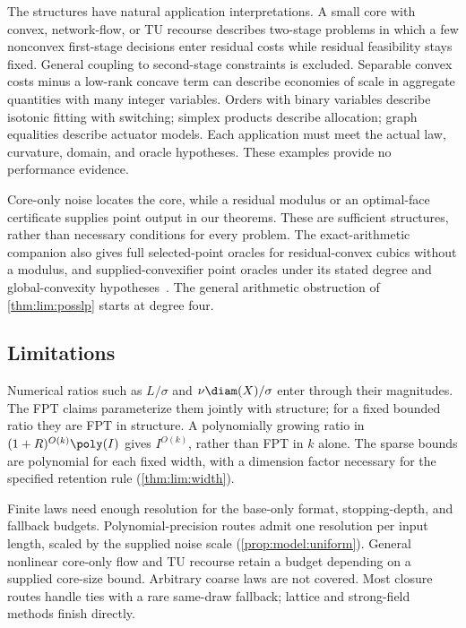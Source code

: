 The structures have natural application interpretations. A small core with
convex, network-flow, or TU recourse describes two-stage problems in which a
few nonconvex first-stage decisions enter residual costs while residual
feasibility stays fixed. General coupling to second-stage constraints is
excluded. Separable convex costs minus a low-rank concave term can describe
economies of scale in aggregate quantities with many integer variables.
Orders with binary variables describe isotonic fitting with switching;
simplex products describe allocation; graph equalities describe actuator
models. Each application must meet the actual law, curvature, domain, and
oracle hypotheses. These examples provide no performance evidence.

Core-only noise locates the core, while a residual modulus or an optimal-face
certificate supplies point output in our theorems. These are sufficient
structures, rather than necessary conditions for every problem. The
exact-arithmetic companion also gives full selected-point oracles for
residual-convex cubics without a modulus, and supplied-convexifier point
oracles under its stated degree and global-convexity
hypotheses~\citep{companion-exact-arithmetic}. The general arithmetic
obstruction of \cref{thm:lim:posslp} starts at degree four.

\subsection{Limitations}\label{sec:disc:limits}

Numerical ratios such as $L/\sigma$ and $\nu\diam(X)/\sigma$ enter through
their magnitudes. The FPT claims parameterize them jointly with structure;
for a fixed bounded ratio they are FPT in structure. A polynomially growing
ratio in $(1+R)^{O(k)}\poly(I)$ gives $I^{O(k)}$, rather than FPT in $k$
alone. The sparse bounds are polynomial for each fixed width, with a
dimension factor necessary for the specified retention rule
(\cref{thm:lim:width}).

Finite laws need enough resolution for the base-only format, stopping-depth,
and fallback budgets. Polynomial-precision routes admit one resolution per
input length, scaled by the supplied noise scale (\cref{prop:model:uniform}).
General nonlinear core-only flow and TU recourse retain a budget depending
on a supplied core-size bound. Arbitrary coarse laws are not covered. Most
closure routes handle ties with a rare same-draw fallback; lattice and
strong-field methods finish directly.

